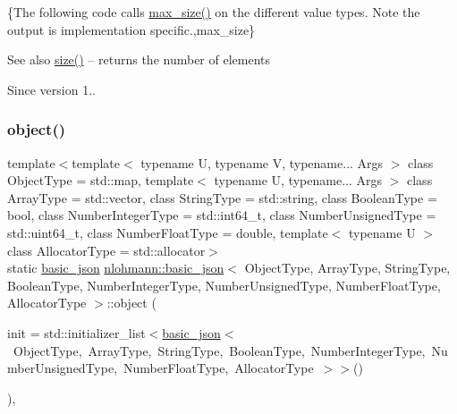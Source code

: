 \{The following code calls {\ttfamily \hyperlink{classnlohmann_1_1basic__json_a7936417b875b7ec737f77ef84bbf7871}{max\+\_\+size()}} on the different value types. Note the output is implementation specific.,max\+\_\+size\}

\begin{DoxySeeAlso}{See also}
\hyperlink{classnlohmann_1_1basic__json_a0ea8a1ecca4b3cb0ba09ad7552c364b6}{size()} -- returns the number of elements
\end{DoxySeeAlso}
\begin{DoxySince}{Since}
version 1.. 
\end{DoxySince}
\hypertarget{classnlohmann_1_1basic__json_ad25b2f8c21e241e2d63455537a9294ff}{}\label{classnlohmann_1_1basic__json_ad25b2f8c21e241e2d63455537a9294ff} 
\subsubsection{\texorpdfstring{object()}{object()}}
{\footnotesize\ttfamily template$<$template$<$ typename U, typename V, typename... Args $>$ class Object\+Type = std\+::map, template$<$ typename U, typename... Args $>$ class Array\+Type = std\+::vector, class String\+Type  = std\+::string, class Boolean\+Type  = bool, class Number\+Integer\+Type  = std\+::int64\+\_\+t, class Number\+Unsigned\+Type  = std\+::uint64\+\_\+t, class Number\+Float\+Type  = double, template$<$ typename U $>$ class Allocator\+Type = std\+::allocator$>$ \\
static \hyperlink{classnlohmann_1_1basic__json}{basic\+\_\+json} \hyperlink{classnlohmann_1_1basic__json}{nlohmann\+::basic\+\_\+json}$<$ Object\+Type, Array\+Type, String\+Type, Boolean\+Type, Number\+Integer\+Type, Number\+Unsigned\+Type, Number\+Float\+Type, Allocator\+Type $>$\+::object (\begin{DoxyParamCaption}\item[{std\+::initializer\+\_\+list$<$ \hyperlink{classnlohmann_1_1basic__json}{basic\+\_\+json}$<$ Object\+Type, Array\+Type, String\+Type, Boolean\+Type, Number\+Integer\+Type, Number\+Unsigned\+Type, Number\+Float\+Type, Allocator\+Type $>$ $>$}]{init = {\ttfamily std\+:\+:initializer\+\_\+list$<$\hyperlink{classnlohmann_1_1basic__json}{basic\+\_\+json}$<$~ObjectType,~ArrayType,~StringType,~BooleanType,~NumberIntegerType,~NumberUnsignedType,~NumberFloatType,~AllocatorType~$>$$>$()} }\end{DoxyParamCaption})\hspace{0.3cm}{\ttfamily [inline]}, {\ttfamily [static]}}



